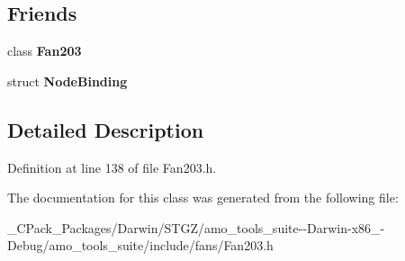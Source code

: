 \subsection*{Friends}
\begin{DoxyCompactItemize}
\item 
\mbox{\label{class_plane_data_ad537df0087a4a6f474dc9d50579cc33d}} 
class {\bfseries Fan203}
\item 
\mbox{\label{class_plane_data_a9c01399c7976e2638c99aa7c4d25ac69}} 
struct {\bfseries Node\+Binding}
\end{DoxyCompactItemize}


\subsection{Detailed Description}


Definition at line 138 of file Fan203.\+h.



The documentation for this class was generated from the following file\+:\begin{DoxyCompactItemize}
\item 
\+\_\+\+C\+Pack\+\_\+\+Packages/\+Darwin/\+S\+T\+G\+Z/amo\+\_\+tools\+\_\+suite-\/-\/\+Darwin-\/x86\+\_-\/\+Debug/amo\+\_\+tools\+\_\+suite/include/fans/Fan203.\+h\end{DoxyCompactItemize}

